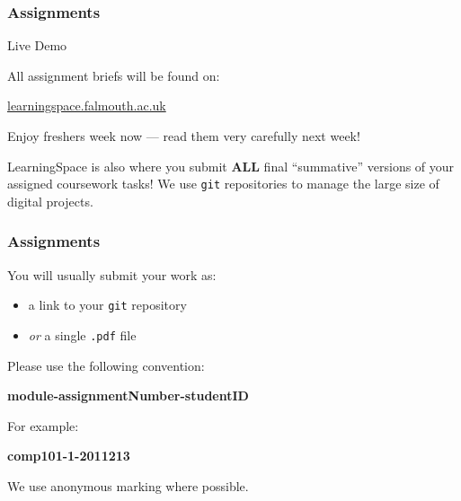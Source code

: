 \begin{frame}
	\frametitle{Assignments}
	
	Live Demo
	
	\vspace{3em}
	
	All assignment briefs will be found on:
	
	\vspace{0.5em}
	
	\indent \url{learningspace.falmouth.ac.uk}
	
	\vspace{0.5em}
	
	Enjoy freshers week now --- read them very carefully next week!
	
	\vspace{0.5em}
	
	LearningSpace is also where you submit \textbf{ALL} final ``summative'' versions of your assigned coursework tasks! We use \texttt{git} repositories to manage the large size of digital projects.
	
\end{frame}

\begin{frame}
	\frametitle{Assignments}
	
	You will usually submit your work as:
	
	\begin{itemize}
	    \item a link to your \texttt{git} repository
	    \item \textit{or} a single \texttt{.pdf} file
	\end{itemize}
	
	\vspace{1em}
	
	 Please use the following convention:
	
	\begin{large}
		\begin{center}
			\textbf{module-assignmentNumber-studentID}
		\end{center}
	\end{large}
	
	For example:
	
	\begin{Large}
		\begin{center}
			\textbf{comp101-1-2011213}
		\end{center}
	\end{Large}
	
	\vspace{1em}
	
	We use anonymous marking where possible.

\end{frame}

